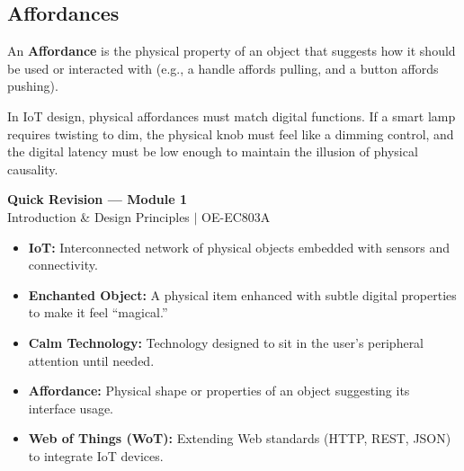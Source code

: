 \documentclass[12pt,a4paper]{article}
\begin{document}
\subsection{Affordances}
\begin{tcolorbox}[defbox, title={Affordance}]
  An \textbf{Affordance} is the physical property of an object that suggests how it should be used or interacted with (e.g., a handle affords pulling, and a button affords pushing).
\end{tcolorbox}
In IoT design, physical affordances must match digital functions. If a smart lamp requires twisting to dim, the physical knob must feel like a dimming control, and the digital latency must be low enough to maintain the illusion of physical causality.

\newpage

\begin{center}
  {\large\bfseries\color{myred} Quick Revision — Module 1}\\[3pt]
  {\small\color{mydark} Introduction \& Design Principles $|$ OE-EC803A}
\end{center}
\noindent{\color{myred}\rule{\linewidth}{1.2pt}}
\vspace{8pt}

\begin{tcolorbox}[defbox, title={\textbf{One-Line Definitions}}]
\begin{itemize}[leftmargin=*, itemsep=3pt, topsep=0pt]
  \item \textbf{IoT:} Interconnected network of physical objects embedded with sensors and connectivity.
  \item \textbf{Enchanted Object:} A physical item enhanced with subtle digital properties to make it feel ``magical.''
  \item \textbf{Calm Technology:} Technology designed to sit in the user's peripheral attention until needed.
  \item \textbf{Affordance:} Physical shape or properties of an object suggesting its interface usage.
  \item \textbf{Web of Things (WoT):} Extending Web standards (HTTP, REST, JSON) to integrate IoT devices.
\end{itemize}
\end{tcolorbox}

\vspace{6pt}
\end{document}
